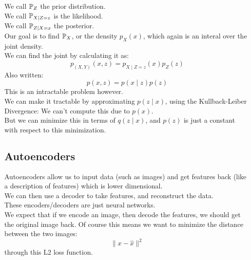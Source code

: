 \documentclass[12pt]{article}
\begin{document}
We call $\mathbb{P}_Z$ the prior distribution. \\

We call $\mathbb{P}_{X \mid Z = z}$ is the likelihood. \\

We call $\mathbb{P}_{Z \mid X = x}$ the posterior. \\

Our goal is to find $\mathbb{P}_X$, or the density
$p_X(x)$, which again is an interal
over the joint density. \\
We can find the joint by calculating it as:
\[ p_{(X, Y)}(x, z) = p_{X \mid Z = z}(x)p_Z(z) \]
Also written:
\[ p(x, z) = p(x \mid z)p(z) \]
This is an intractable problem however. \\

We can make it tractable by approximating
$p(z \mid x)$, using the Kullback-Leiber Divergence:
We can't compute this due to $p(x)$. \\
But we can minimize this in terms of $q(z \mid x)$,
and $p(z)$ is just a constant with respect to
this minimization. \\

\newpage

\subsection*{Autoencoders}

Autoencoders allow us to input data (such as images)
and get features back (like a description of
features) which is lower dimensional. \\

We can then use a decoder to take features, 
and reconstruct the data. \\

These encoders/decoders are just neural networks. \\

We expect that if we encode an image, then decode
the features, we should get the original image
back. Of course this means we want to minimize 
the distance between the two images:
\[ \|x - \hat{x}\|^2 \]
through this L2 loss function. \\
\end{document}
